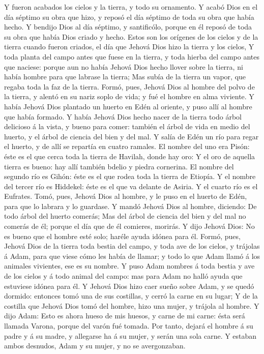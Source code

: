  Y fueron acabados los cielos y la tierra, y todo su
ornamento.  Y acabó Dios en el día séptimo su obra que hizo,
y reposó el día séptimo de toda su obra que había hecho.  Y
bendijo Dios al día séptimo, y santificólo, porque en él reposó de toda
su obra que había Dios criado y hecho.  Estos son los
orígenes de los cielos y de la tierra cuando fueron criados, el día que
Jehová Dios hizo la tierra y los cielos,  Y toda planta del
campo antes que fuese en la tierra, y toda hierba del campo antes que
naciese: porque aun no había Jehová Dios hecho llover sobre la tierra,
ni había hombre para que labrase la tierra;  Mas subía de la
tierra un vapor, que regaba toda la faz de la tierra. 
Formó, pues, Jehová Dios al hombre del polvo de la tierra, y alentó en
su nariz soplo de vida; y fué el hombre en alma viviente.  Y
había Jehová Dios plantado un huerto en Edén al oriente, y puso allí al
hombre que había formado.  Y había Jehová Dios hecho nacer
de la tierra todo árbol delicioso á la vista, y bueno para comer:
también el árbol de vida en medio del huerto, y el árbol de ciencia del
bien y del mal.  Y salía de Edén un río para regar el
huerto, y de allí se repartía en cuatro ramales.  El nombre
del uno era Pisón: éste es el que cerca toda la tierra de Havilah, donde
hay oro:  Y el oro de aquella tierra es bueno: hay allí
también bdelio y piedra cornerina.  El nombre del segundo
río es Gihón: éste es el que rodea toda la tierra de Etiopía.
 Y el nombre del tercer río es Hiddekel: éste es el que va
delante de Asiria. Y el cuarto río es el Eufrates.  Tomó,
pues, Jehová Dios al hombre, y le puso en el huerto de Edén, para que lo
labrara y lo guardase.  Y mandó Jehová Dios al hombre,
diciendo: De todo árbol del huerto comerás;  Mas del árbol
de ciencia del bien y del mal no comerás de él; porque el día que de él
comieres, morirás.  Y dijo Jehová Dios: No es bueno que el
hombre esté solo; haréle ayuda idónea para él.  Formó,
pues, Jehová Dios de la tierra toda bestia del campo, y toda ave de los
cielos, y trájolas á Adam, para que viese cómo les había de llamar; y
todo lo que Adam llamó á los animales vivientes, ese es su nombre.
 Y puso Adam nombres á toda bestia y ave de los cielos y á
todo animal del campo: mas para Adam no halló ayuda que estuviese idónea
para él.  Y Jehová Dios hizo caer sueño sobre Adam, y se
quedó dormido: entonces tomó una de sus costillas, y cerró la carne en
su lugar;  Y de la costilla que Jehová Dios tomó del
hombre, hizo una mujer, y trájola al hombre.  Y dijo Adam:
Esto es ahora hueso de mis huesos, y carne de mi carne: ésta será
llamada Varona, porque del varón fué tomada.  Por tanto,
dejará el hombre á su padre y á su madre, y allegarse ha á su mujer, y
serán una sola carne.  Y estaban ambos desnudos, Adam y su
mujer, y no se avergonzaban.

